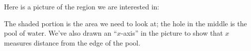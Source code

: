 \documentclass{article}
\begin{document}
\begin{enumerate}
\begin{enumerate}
\begin{enumerate}
      \begin{solution}
        Here is a picture of the region we are interested in: 
        \begin{center}
        \end{center}
        The shaded portion is the area we need to look at; the hole in the
        middle is the pool of water.  We've also drawn an ``$x$-axis'' in
        the picture to show that $x$ measures distance from the edge of the
        pool. 


\end{solution}
\end{enumerate}
\end{enumerate}
\end{enumerate}
\end{document}
